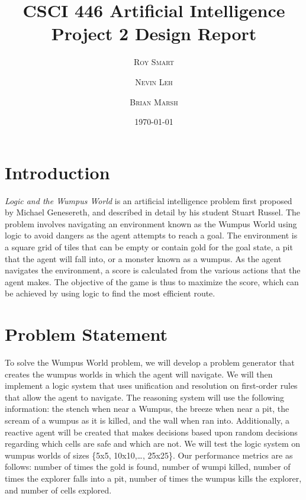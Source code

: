 \documentclass{article}
\title{\vspace{-15mm}\fontsize{24pt}{10pt}\selectfont\textbf{CSCI 446 Artificial Intelligence \\[2mm] Project 2 Design Report} } %
\date{\today}
\author{
\large
\textsc{Roy Smart} \and \textsc{Nevin Leh} \and \textsc{Brian Marsh}\\[2mm] %
}
\begin{document}
	\maketitle %
	\thispagestyle{fancy} %
	\normalsize

	\section{Introduction}
	
		\textit{Logic and the Wumpus World} is an artificial intelligence problem first proposed by Michael Genesereth, and described in detail by his student Stuart Russel\cite{ai}.  The problem involves navigating an environment known as the Wumpus World using logic to avoid dangers as the agent attempts to reach a goal.  The environment is a square grid of tiles that can be empty or contain gold for the goal state, a pit that the agent will fall into, or a monster known as a wumpus.  As the agent navigates the environment, a score is calculated from the various actions that the agent makes.  The objective of the game is thus to maximize the score, which can be achieved by using logic to find the most efficient route.
	
	\section{Problem Statement}


		To solve the Wumpus World problem, we will develop a problem generator that creates the wumpus worlds in which the agent will navigate.  We will then implement a logic system that uses unification and resolution on first-order rules that allow the agent to navigate.  The reasoning system will use the following information: the stench when near a Wumpus, the breeze when near a pit, the scream of a wumpus as it is killed, and the wall when ran into.  Additionally, a reactive agent will be created that makes decisions based upon random decisions regarding which cells are safe and which are not.  We will test the logic system on wumpus worlds of sizes \{5x5, 10x10,\dots, 25x25\}.  Our performance metrics are as follows: number of times the gold is found, number of wumpi killed, number of times the explorer falls into a pit, number of times the wumpus kills the explorer, and number of cells explored.
		
\end{document}
